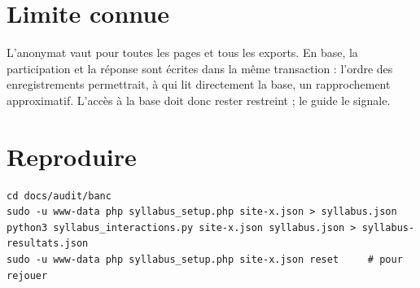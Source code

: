 \documentclass[11pt,a4paper]{article}
\begin{document}
\section{Limite connue}

L'anonymat vaut pour toutes les pages et tous les exports. En base, la participation et la
réponse sont écrites dans la même transaction : l'ordre des enregistrements permettrait, à qui
lit directement la base, un rapprochement approximatif. L'accès à la base doit donc rester
restreint ; le guide le signale.

\section{Reproduire}

{\small
\begin{verbatim}
cd docs/audit/banc
sudo -u www-data php syllabus_setup.php site-x.json > syllabus.json
python3 syllabus_interactions.py site-x.json syllabus.json > syllabus-resultats.json
sudo -u www-data php syllabus_setup.php site-x.json reset     # pour rejouer
\end{verbatim}
}
\end{document}
